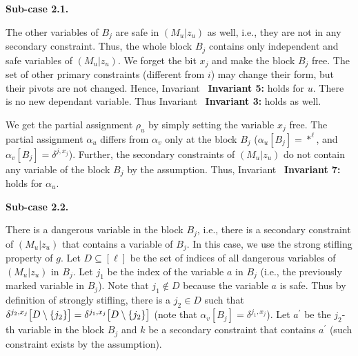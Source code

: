 \par\medskip\noindent\textbf{Sub-case 2.1.}\par




The other variables of $B_{j}$ are safe in $(M_{u}|z_{u})$ as well, i.e., they are not in any secondary constraint.
Thus, the whole block $B_{j}$ contains only independent and safe variables of $(M_{u}|z_{u})$.
We forget the bit $x_{j}$ and make the block $B_{j}$ free.
The set of other primary constraints (different from $i$) may change their form, but their pivots are not changed. Hence, Invariant \textbf{ Invariant 5:} holds for $u$.
There is no new dependant variable. Thus Invariant \textbf{ Invariant 3:} holds as well.\par




We get the partial assignment $\rho_{u}$ by simply setting the variable $x_{j}$ free.
The partial assignment $\alpha_{u}$ differs from $\alpha_{v}$ only at the block $B_{j}$ ($\alpha_{u}[B_{j}]=*^{\ell}$, and $\alpha_{v}[B_{j}]=\delta^{j,x_{j}}$).
Further, the secondary constraints of $(M_{u}|z_{u})$ do not contain any variable of the block $B_{j}$ by the assumption.
Thus, Invariant \textbf{ Invariant 7:} holds for $\alpha_{u}$.\par





\par\medskip\noindent\textbf{Sub-case 2.2.}\par




There is a dangerous variable in the block $B_{j}$, i.e., there is a secondary constraint of $(M_{u}|z_{u})$ that contains a variable of $B_{j}$.
In this case, we use the strong stifling property of $g$.
Let $D\subseteq[\ell]$ be the set of indices of all dangerous variables of $(M_{u}|z_{u})$ in $B_{j}$.
Let $j_{1}$ be the index of the variable $a$ in $B_{j}$ (i.e., the previously marked variable in $B_{j}$).
Note that $j_{1}\not\in D$ because the variable $a$ is safe.
Thus by definition of strongly stifling, there is a $j_{2}\in D$ such that $\delta^{j_{2},x_{j}}\bigl{[}D\setminus\{j_{2}\}\bigr{]}=\delta^{j_{1},x_{j}}%
\bigl{[}D\setminus\{j_{2}\}\bigr{]}$ (note that $\alpha_{v}[B_{j}]=\delta^{j_{1},x_{j}}$).
Let $a^{\prime}$ be the $j_{2}$-th variable in the block $B_{j}$ and $k$ be a secondary constraint that contains $a^{\prime}$ (such constraint exists by the assumption).\par




